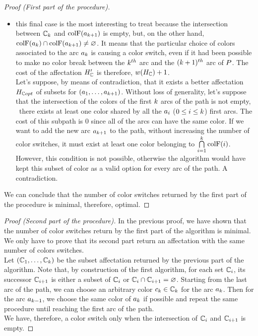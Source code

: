 \begin{proof}[Proof (First part of the procedure)]
\begin{itemize}
\begin{itemize}
            \item this final case is the most interesting to treat because the intersection between $\mathbb{C}_{k}$ and $\text{colF}(a_{k+1})$ is empty, but, on the other hand, $\text{colF}(a_{k}) \cap \text{colF}(a_{k+1}) \neq \varnothing$. It means that the particular choice of colors associated to the arc $a_k$ is causing a color switch, even if it had been possible to make no color break between the $k^{th}$ arc and the  $(k+1)^{th}$ arc of $P$. The cost of the affectation $H_{\mathbb{C}}'$ is therefore, $w(H_{\mathbb{C}}) + 1$.\\
                  Let's suppose, by means of contradiction, that it exists a better affectation $H_{\mathbb{C} opt}$ of subsets for $(a_1,\ldots,a_{k + 1})$. Without loss of generality, let's suppose that the intersection of the colors of the first $k$ arcs of the path is not empty, \ie\ there exists at least one color shared by all the $a_i$ ($0 \leq i \leq k$) first arcs. The cost of this subpath is $0$ since all of the arcs can have the same color. If we want to add the new arc $a_{k + 1}$ to the path, without increasing the number of color switches, it must exist at least one color belonging to $\bigcap\limits_{i = 1}^k \text{colF}(i)$. However, this condition is not possible, otherwise the algorithm would have kept this subset of color as a valid option for every arc of the path. A contradiction.
          \end{itemize}
  \end{itemize}
  We can conclude that the number of color switches returned by the first part of the procedure is minimal, therefore, optimal.
\end{proof}

\begin{proof}[Proof (Second part of the procedure)]
  In the previous proof, we have shown that the number of color switches return by the first part of the algorithm is minimal. We only have to prove that its second part return an affectation with the same number of colors switches.\\
  Let $(\mathbb{C}_1,\ldots,\mathbb{C}_{k})$ be the subset affectation returned by the previous part of the algorithm. Note that, by construction of the first algorithm, for each set $\mathbb{C}_i$, its successor $\mathbb{C}_{i+1}$ is either a subset of $\mathbb{C}_i$ or $\mathbb{C}_i \cap \mathbb{C}_{i+1} = \varnothing$.
  Starting from the last arc of the path, we can choose an arbitrary color $c_k \in \mathbb{C}_k$ for the arc $a_k$. Then for the arc $a_{k-1}$, we choose the same color of $a_k$ if possible and repeat the same procedure until reaching the first arc of the path.\\
  We have, therefore, a color switch only when the intersection of $\mathbb{C}_i$ and $\mathbb{C}_{i+1}$ is empty.
\end{proof}


